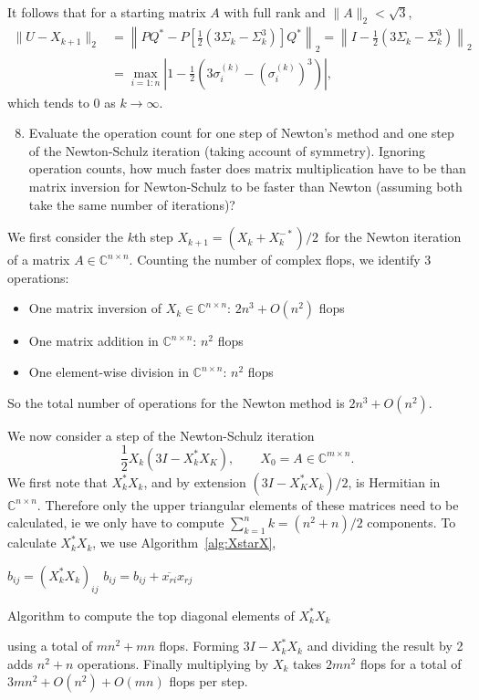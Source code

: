 \documentclass[10pt, A4paper]{article}
\newcommand{\mxn}{m \times n}
\newcommand{\nxn}{n \times n}
\begin{document}
It follows that for a starting matrix $A$ with full rank and $\|A\|_2 < 
\sqrt{3}$,
\begin{align*}
	\|U-X_{k+1}\|_2 &= \left\|PQ^* - P\left[\frac{1}{2}(3 \Sigma_k
	-\Sigma_k^3)\right] Q^*\right\|_2
	= \left\|I - \frac{1}{2}(3\Sigma_k - \Sigma_k^3)\right\|_2 \\
	&= \max_{i = 1:n} \left|1 - \frac{1}{2}\left(3 \sigma_i^{(k)} - 
	(\sigma_i^{(k)})^3\right)\right|,
\end{align*}
which tends to 0 as $k \to \infty$.





\vspace{0.2cm}
\begin{enumerate}
	\setcounter{enumi}{7}
	\item Evaluate the operation count for one step of Newton's 
	method and one step of the Newton\nobreakdash-Schulz iteration (taking
	account of symmetry). Ignoring operation counts, how much faster
	does matrix multiplication have to be than matrix inversion for
	Newton\nobreakdash-Schulz to be faster than Newton (assuming both take the same number of iterations)?
\end{enumerate}

We first consider the $k$th step $X_{k+1} = (X_k + X_k^{-*})/2\,$ for 
the Newton iteration of a matrix $A \in \mathbb{C}^{n\times n}$. 
Counting the number of complex flops, we identify 3 operations:
\begin{itemize}
	\item One matrix inversion of $X_k \in \mathbb{C}^{\nxn}$: 
	\hfill
	$2n^3 + O(n^2)$ flops
	
	\item One matrix addition in $\mathbb{C}^{\nxn}$:
	\hfill
	$n^2$ flops
	
	\item One element-wise division in $\mathbb{C}^{\nxn}$:
	\hfill
	$n^2$ flops
\end{itemize}
So the total number of operations for the Newton method is $2n^3 + 
O(n^2)$.

We now consider a step of the Newton-Schulz iteration $$\frac{1}{2} 
X_k(3I - X_k^*X_K), \qquad X_0 = A \in \mathbb{C}^{\mxn}.$$
We first note that $X_k^*X_k$, and by extension $(3I - X_K^*X_k)/2$, is 
Hermitian in $\mathbb{C}^{\nxn}$.
Therefore only the upper triangular elements of these matrices need to 
be calculated, ie we only have to compute $\sum_{k=1}^{n} k= (n^2+n)/2$ 
components.
To calculate $X_k^*X_k$, we use Algorithm~\ref{alg:XstarX},
\begin{algorithm}
	$b_{ij} = (X_k^*X_k)_{ij}$ \;
	{
		{
				{
					$b_{ij} = b_{ij} + \overline{x_{ri}}x_{rj}$ \;
				}
		}
	}
	\caption{Algorithm to compute the top diagonal elements of 
	$X_k^*X_k$}
	\label{alg:XstarX}
\end{algorithm}
using a total of $mn^2 + mn$ flops. Forming $3I - X_k^*X_k$ and 
dividing the result by 2 adds $n^2 + n$ operations. Finally multiplying 
by $X_k$ takes $2mn^2$ flops for a total of $3mn^2 + O(n^2) + O(mn)$ 
flops per step.
\end{document}

